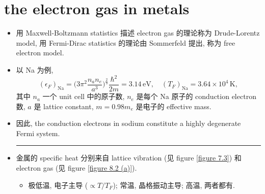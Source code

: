 \section{the electron gas in metals}
\begin{itemize}
	\item 用 Maxwell-Boltzmann statistics 描述 electron gas 的理论称为 Drude-Lorentz model, 用 Fermi-Dirac statistics 的理论由 Sommerfeld 提出, 称为 free electron model.
	
	\item 以 Na 为例,
	\begin{equation}
		(\epsilon_F)_\text{Na} = \Big( 3 \pi^2 \frac{n_a n_e}{a^3} \Big)^{\frac{2}{3}} \frac{\hbar^2}{2 m} = 3.14 \, \text{eV}, \quad (T_F)_\text{Na} = 3.64 \times 10^4 \, \text{K},
	\end{equation}
	其中 $n_a$ 一个 unit cell 中的原子数, $n_e$ 是每个 Na 原子的 conduction electron 数, $a$ 是 lattice constant, $m = 0.98 m_e$ 是电子的 effective mass.
	
	\item 因此, the conduction electrons in sodium constitute a highly degenerate Fermi system.
	
	\noindent\rule[0.5ex]{\linewidth}{0.5pt} %
	
	\item 金属的 specific heat 分别来自 lattice vibration (见 figure \ref{figure 7.3}) 和 electron gas (见 figure \ref{figure 8.2 (a)}).
	\begin{itemize}
		\item 极低温, 电子主导 ($\propto T / T_F$); 常温, 晶格振动主导; 高温, 两者都有.
	\end{itemize}
\end{itemize}

